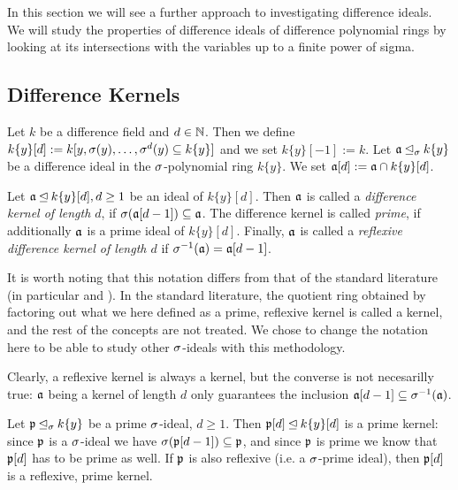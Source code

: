 In this section we will see a further approach to investigating difference ideals. We will study the properties of difference ideals of difference polynomial rings by looking at its intersections with the variables up to a finite power of sigma.

\subsection{Difference Kernels}


\begin{defn}
Let $k$ be a difference field and $d \in \mathbb{N}$. Then we define $k\{y\}[d]:= k[y,\sigma(y),\ldots,\sigma^d(y) \subseteq k\{y\}]$ and we set $k\{y\}[-1] := k$. Let $\mathfrak{a} \unlhd_{\sigma} k\{y\}$ be a difference ideal in the $\sigma$-polynomial ring $k\{y\}$. 
We set $\mathfrak{a}[d] := \mathfrak{a} \cap k\{y\}[d]$.
\end{defn}


\begin{defn}
Let $\mathfrak{a} \unlhd k\{y\}[d], d \geq 1$ be an ideal of $k\{y\}[d]$. Then $\mathfrak{a}$ is called a \emph{difference kernel of length $d$}, if $\sigma(\mathfrak{a}[d-1]) \subseteq \mathfrak{a}$. The difference kernel is called \emph{prime}, if additionally $\mathfrak{a}$ is a prime ideal of $k\{y\}[d]$.
Finally, $\mathfrak{a}$ is called a \emph{reflexive difference kernel of length $d$} if $\sigma^{-1}(\mathfrak{a}) = \mathfrak{a}[d-1]$.   
\end{defn}

It is worth noting that this notation differs from that of the standard literature (in particular \cite{cohn} and \cite{levin}). In the standard literature, the quotient ring obtained by factoring out 
what we here defined as a prime, reflexive kernel is called a kernel, and the rest of the concepts are not treated. We chose to change the notation here to be able to study other $\sigma$-ideals with this methodology.

\begin{rem}
Clearly, a reflexive kernel is always a kernel, but the converse is not necesarilly true: $\mathfrak{a}$ being a kernel of length $d$ only guarantees the inclusion $\mathfrak{a}[d-1] \subseteq \sigma^{-1}(\mathfrak{a})$.
\end{rem}

\begin{ex}
Let $\mathfrak{p} \unlhd_{\sigma} k\{y\}$ be a prime $\sigma$-ideal, $d \geq 1$. Then $\mathfrak{p}[d] \unlhd k\{y\}[d]$ is a prime kernel: since $\mathfrak{p}$ is a $\sigma$-ideal we have $\sigma(\mathfrak{p}[d-1]) \subseteq \mathfrak{p}$, 
and since $\mathfrak{p}$ is prime we know that $\mathfrak{p}[d]$ has to be prime as well. If $\mathfrak{p}$ is also reflexive (i.e. a $\sigma$-prime ideal), then $\mathfrak{p}[d]$ is a reflexive, prime kernel. 
\end{ex}

